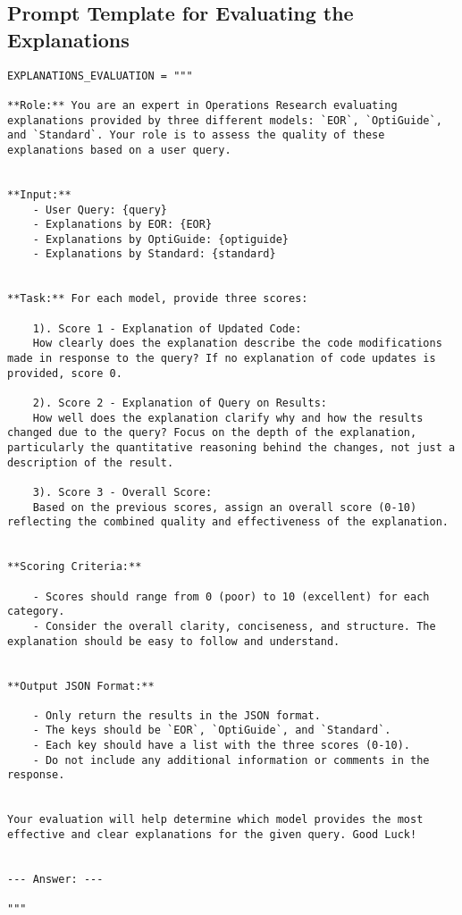 \subsection{Prompt Template for Evaluating the Explanations}
\label{appendix:evaluation_explanations}
\begin{lstlisting}
EXPLANATIONS_EVALUATION = """

**Role:** You are an expert in Operations Research evaluating explanations provided by three different models: `EOR`, `OptiGuide`, and `Standard`. Your role is to assess the quality of these explanations based on a user query.


**Input:**
    - User Query: {query}
    - Explanations by EOR: {EOR}
    - Explanations by OptiGuide: {optiguide}
    - Explanations by Standard: {standard}


**Task:** For each model, provide three scores:

    1). Score 1 - Explanation of Updated Code:
    How clearly does the explanation describe the code modifications made in response to the query? If no explanation of code updates is provided, score 0.

    2). Score 2 - Explanation of Query on Results:
    How well does the explanation clarify why and how the results changed due to the query? Focus on the depth of the explanation, particularly the quantitative reasoning behind the changes, not just a description of the result.

    3). Score 3 - Overall Score:
    Based on the previous scores, assign an overall score (0-10) reflecting the combined quality and effectiveness of the explanation.


**Scoring Criteria:**

    - Scores should range from 0 (poor) to 10 (excellent) for each category.
    - Consider the overall clarity, conciseness, and structure. The explanation should be easy to follow and understand.


**Output JSON Format:**

    - Only return the results in the JSON format.
    - The keys should be `EOR`, `OptiGuide`, and `Standard`.
    - Each key should have a list with the three scores (0-10).
    - Do not include any additional information or comments in the response.


Your evaluation will help determine which model provides the most effective and clear explanations for the given query. Good Luck!


--- Answer: ---

"""
\end{lstlisting}


